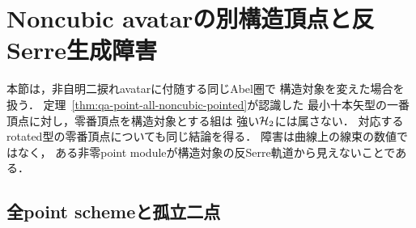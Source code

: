 \section{Noncubic avatarの別構造頂点と反Serre生成障害}
\label{sec:qa-spinor-pointing-obstruction}

本節は，非自明二捩れavatarに付随する同じAbel圏で
構造対象を変えた場合を扱う．
定理~\ref{thm:qa-point-all-noncubic-pointed}が認識した
最小十本矢型の一番頂点に対し，零番頂点を構造対象とする組は
強い$\mathcal H_2$には属さない．
対応するrotated型の零番頂点についても同じ結論を得る．
障害は曲線上の線束の数値ではなく，
ある非零point moduleが構造対象の反Serre軌道から見えないことである．

\subsection{全point schemeと孤立二点}

